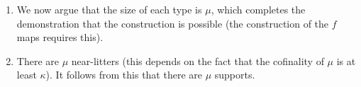 \documentclass[12pt]{article}
\begin{document}
\begin{enumerate}
\item  We now argue that the size of each type is $\mu$, which completes the demonstration that the construction is possible (the construction of the $f$ maps requires this).

\item  There are $\mu$ near-litters (this depends on the fact that the cofinality of $\mu$ is at least $\kappa$).  It follows from this that there are $\mu$ supports.








\end{enumerate}
\end{document}
